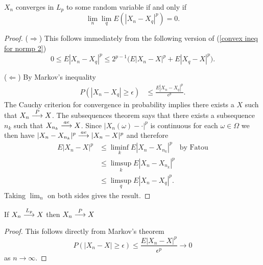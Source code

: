 \begin{theorem}
\label{cauchy for Lp}
$X_n$ converges in $L_p$ to some random variable if and only if
\begin{equation}
\lim_n \lim_q E (|X_n-X_q|^p)=0.
\end{equation}
\end{theorem}
\begin{proof}
($\Longrightarrow$) This follows immediately from the following version of (\ref{convex ineq for normp 2}) 
\[
 0\leq E|X_n-X_q|^p\leq 2^{p-1}\bigl(E|X_n-X|^p + E|X_q-X|^p\bigr).
\] 

($\Longleftarrow$)
By Markov's inequality
\begin{align*}
P(|X_n - X_q|\geq \epsilon) &\leq \frac{E|X_n - X_q|^p}{\epsilon^p}.
\end{align*}
The Cauchy criterion for convergence in probability implies there exists a $X$ such that $X_n\overset{\small P} \longrightarrow X$. 
The subsequences theorem says that there exists a subsequence $n_k$ such that $X_{n_k}\overset{\small ae} \longrightarrow X$.
Since $|X_n(\omega) - \cdot|^p$ is continuous for each $\omega\in \Omega$ we then have $|X_n - X_{n_k}|^p \overset{\small ae} \longrightarrow |X_n - X|^p$ and therefore
\begin{align*}
 E|X_n - X|^p &\leq \liminf_k E|X_n - X_{n_k}|^p\quad \text{by Fatou}\\
 &\leq \limsup_k E|X_n - X_{n_k}|^p\\
 &\leq \limsup_q E|X_n - X_q|^p.
 \end{align*}
 Taking $\lim_n$ on both sides gives the result. 



\end{proof}


\begin{theorem}
\label{thm Lp implies P}
If $X_n \overset{\small L_p} \longrightarrow X$ then $X_n \overset{\small P} \longrightarrow X$
\end{theorem}
\begin{proof}
This follows directly from Markov's theorem
\[
P(|X_n -X|\geq \epsilon)\leq \frac{E|X_n - X|^p}{\epsilon^p}\rightarrow 0
\]
as $n\rightarrow \infty$.
\end{proof}



